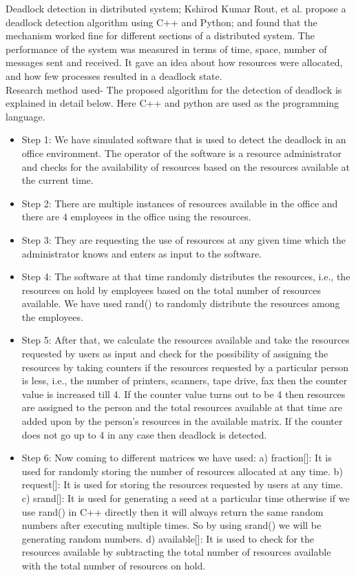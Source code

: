 \documentclass[sigplan,screen]{acmart}
\begin{document}
\par
Deadlock detection in distributed system; Kshirod Kumar Rout, et al.  propose a deadlock detection algorithm using C++ and Python; and found that the mechanism worked fine for different sections of a distributed system. The performance of the system was measured in terms of time, space, number of messages sent and received. It gave an idea about how resources were allocated, and how few processes resulted in a deadlock state.
\\
Research method used-
\newline
The proposed algorithm for the detection of deadlock is explained in detail below. Here C++ and python are used as the programming language.
\begin{itemize}
\item Step 1: We have simulated software that is used to detect the deadlock in an office environment. The operator of the software is a resource administrator and checks for the availability of resources based on the resources available at the current time.
\item Step 2: There are multiple instances of resources available in the office and there are 4 employees in the office using the resources.
\item Step 3: They are requesting the use of resources at any given time which the administrator knows and enters as input to the software.
\item Step 4: The software at that time randomly distributes the resources, i.e., the resources on hold by employees based on the total number of resources available. We have used rand() to randomly distribute the resources among the employees.
\item Step 5: After that, we calculate the resources available and take the resources requested by users as input and check for the possibility of assigning the resources by taking counters if the resources requested by a particular person is less, i.e., the number of printers, scanners, tape drive, fax then the counter value is increased till 4. If the counter value turns out to be 4 then resources are assigned to the person and the total resources available at that time are added upon by the person’s resources in the available matrix. If the counter does not go up to 4 in any case then deadlock is detected.
\item Step 6: Now coming to different matrices we have used:
a) fraction[]: It is used for randomly storing the number of resources allocated at any time.
b) request[]: It is used for storing the resources requested by users at any time.
c) srand[]: It is used for generating a seed at a particular time otherwise if we use rand() in C++ directly then it will always return the same random numbers after executing multiple times. So by using srand() we will be generating random numbers.
d) available[]: It is used to check for the resources available by subtracting the total number of resources available with the total number of resources on hold.
\end{itemize}
\end{document}
